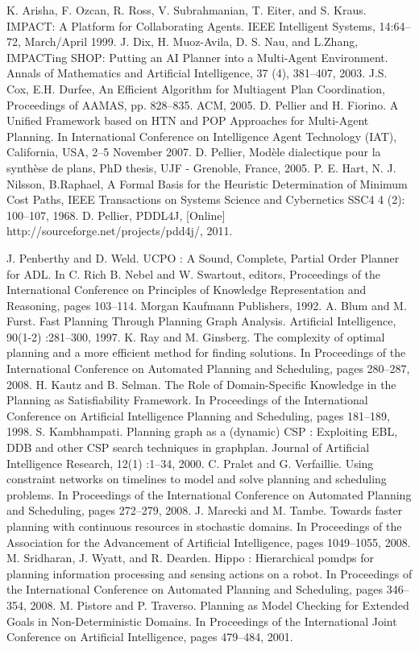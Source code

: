 \begin{thebibliography}{99}
 K. Arisha, F. Ozcan, R. Ross, V. Subrahmanian, T. Eiter, and S. Kraus. IMPACT: A Platform for Collaborating Agents. IEEE Intelligent Systems, 14:64–72, March/April 1999.
 J. Dix, H. Muoz-Avila, D. S. Nau, and L.Zhang, IMPACTing SHOP: Putting an AI Planner into a Multi-Agent Environment. Annals of Mathematics and Artiﬁcial Intelligence, 37 (4), 381–407, 2003.
 J.S. Cox, E.H. Durfee, An Efficient Algorithm for Multiagent Plan Coordination, Proceedings of AAMAS, pp. 828–835. ACM, 2005.
 D. Pellier and H. Fiorino. A Unified Framework based on HTN and POP Approaches for Multi-Agent Planning. In International Conference on
Intelligence Agent Technology (IAT), California, USA, 2–5 November
2007.
 D. Pellier, Modèle dialectique pour la synthèse de plans, PhD thesis, UJF - Grenoble, France, 2005. 
 P. E. Hart, N. J. Nilsson, B.Raphael, A Formal Basis for the Heuristic Determination of Minimum Cost Paths, IEEE Transactions on Systems  Science and Cybernetics SSC4 4 (2): 100–107, 1968.
D.  Pellier,  PDDL4J,  [Online]  http://sourceforge.net/projects/pdd4j/, 
2011. 



 J. Penberthy and D. Weld. UCPO : A Sound, Complete, Partial Order Planner for ADL. In C. Rich B. Nebel and W. Swartout, editors, Proceedings of the International Conference on Principles of Knowledge Representation and Reasoning, pages 103–114. Morgan Kaufmann Publishers, 1992.
 A. Blum and M. Furst. Fast Planning Through Planning Graph Analysis. Artificial Intelligence, 90(1-2) :281–300, 1997.
 K. Ray and M. Ginsberg. The complexity of optimal planning and a more efficient method for finding solutions. In Proceedings of the International Conference on Automated Planning and Scheduling, pages 280–287, 2008.
 H. Kautz and B. Selman. The Role of Domain-Specific Knowledge in the Planning as Satisfiability Framework. In Proceedings of the International Conference on Artificial Intelligence Planning and Scheduling, pages 181–189, 1998.
 S. Kambhampati. Planning graph as a (dynamic) CSP : Exploiting EBL, DDB and other CSP search techniques in graphplan. Journal of Artificial Intelligence Research, 12(1) :1–34, 2000.
 C. Pralet and G. Verfaillie. Using constraint networks on timelines to model and solve planning and scheduling problems. In Proceedings of the International Conference on Automated Planning and Scheduling, pages 272–279, 2008.
 J. Marecki and M. Tambe. Towards faster planning with continuous resources in stochastic domains. In Proceedings of the Association for the Advancement of Artificial Intelligence, pages 1049–1055, 2008.
 M. Sridharan, J. Wyatt, and R. Dearden. Hippo : Hierarchical pomdps for planning information processing and sensing actions on a robot. In Proceedings of the International Conference on Automated Planning and Scheduling, pages 346–354, 2008.
 M. Pistore and P. Traverso. Planning as Model Checking for Extended Goals in Non-Deterministic Domains. In Proceedings of the International Joint Conference on Artificial Intelligence, pages 479–484, 2001.
\end{thebibliography}